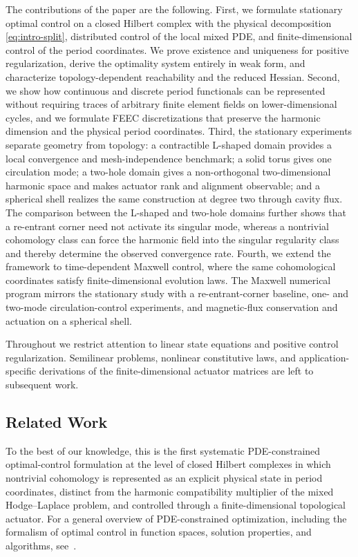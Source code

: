 \documentclass{article}
\begin{document}
The contributions of the paper are the following.  First, we formulate stationary optimal control on a closed Hilbert complex with the physical decomposition \eqref{eq:intro-split}, distributed control of the local mixed PDE, and finite-dimensional control of the period coordinates.  We prove existence and uniqueness for positive regularization, derive the optimality system entirely in weak form, and characterize topology-dependent reachability and the reduced Hessian.  Second, we show how continuous and discrete period functionals can be represented without requiring traces of arbitrary finite element fields on lower-dimensional cycles, and we formulate FEEC discretizations that preserve the harmonic dimension and the physical period coordinates.  Third, the stationary experiments separate geometry from topology: a contractible L-shaped domain provides a local convergence and mesh-independence benchmark; a solid torus gives one circulation mode; a two-hole domain gives a non-orthogonal two-dimensional harmonic space and makes actuator rank and alignment observable; and a spherical shell realizes the same construction at degree two through cavity flux.  The comparison between the L-shaped and two-hole domains further shows that a re-entrant corner need not activate its singular mode, whereas a nontrivial cohomology class can force the harmonic field into the singular regularity class and thereby determine the observed convergence rate.  Fourth, we extend the framework to time-dependent Maxwell control, where the same cohomological coordinates satisfy finite-dimensional evolution laws.  The Maxwell numerical program mirrors the stationary study with a re-entrant-corner baseline, one- and two-mode circulation-control experiments, and magnetic-flux conservation and actuation on a spherical shell.

Throughout we restrict attention to linear state equations and positive control regularization.  Semilinear problems, nonlinear constitutive laws, and application-specific derivations of the finite-dimensional actuator matrices are left to subsequent work.

\subsection{Related Work}
 To the best of our knowledge, this is the first systematic PDE-constrained optimal-control
formulation at the level of closed Hilbert complexes in which nontrivial cohomology is represented
as an explicit physical state in period coordinates, distinct from the harmonic compatibility
multiplier of the mixed Hodge–Laplace problem, and controlled through a finite-dimensional
topological actuator.
For a general overview of PDE-constrained optimization, including the formalism of optimal control in function spaces, solution properties, and algorithms, see~\cite{hinze2008optimization}.
\end{document}
